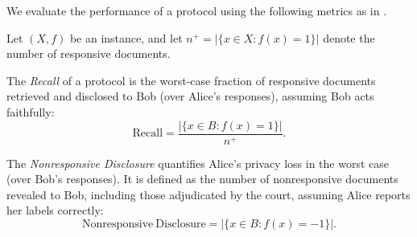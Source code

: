 We evaluate the performance of a protocol using the following metrics as in \citet*{dong2024error}. 


\begin{definition}
Let $(X,f)$ be an instance, and let $n^+ = |\{x \in X : f(x) = 1\}|$ denote the number of responsive documents.

The \emph{Recall} of a protocol is the worst-case fraction of responsive documents retrieved and disclosed to Bob (over Alice's responses), assuming Bob acts faithfully:
\[
\mathrm{Recall} = \frac{|\{x \in B : f(x) = 1\}|}{n^+}.
\]

The \emph{Nonresponsive Disclosure} quantifies Alice’s privacy loss in the worst case (over Bob’s responses). It is defined as the number of nonresponsive documents revealed to Bob, including those adjudicated by the court, assuming Alice reports her labels correctly:
\[
\mathrm{Nonresponsive\ Disclosure} = |\{x \in B : f(x) = -1\}|.
\]
\end{definition}

